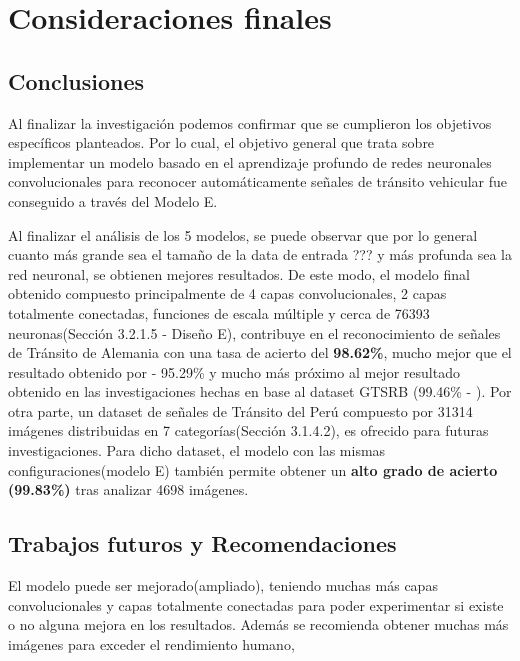 \chapter{Consideraciones finales}
\setcounter{page}{138}
\renewcommand{\baselinestretch}{2} %
\textheight 21cm

\section{Conclusiones}

	Al finalizar la investigación podemos confirmar que se cumplieron los objetivos específicos planteados. Por lo cual, el objetivo general que trata sobre implementar un modelo basado en el aprendizaje profundo de redes neuronales convolucionales para reconocer automáticamente señales de tránsito vehicular fue conseguido a través del Modelo E.

	\vskip 0.2cm
	Al finalizar el análisis de los 5 modelos, se puede observar que por lo general cuanto más grande sea el tamaño de la data de entrada ??? y más profunda sea la red neuronal, se obtienen mejores resultados. De este modo, el modelo final obtenido compuesto principalmente de 4 capas convolucionales, 2 capas totalmente conectadas, funciones de escala múltiple y cerca de 76393 neuronas(Sección 3.2.1.5 - Diseño E), contribuye en el reconocimiento de señales de Tránsito de Alemania con una tasa de acierto del {\bf 98.62\%}, mucho mejor que el resultado obtenido por \citep{Ayuque2016} - 95.29\% y mucho más próximo al mejor resultado obtenido en las investigaciones hechas en base al dataset GTSRB (99.46\% - \citep{Ciresan}).
	\vskip 0.2cm
	Por otra parte, un dataset de señales de Tránsito del Perú compuesto por 31314 imágenes distribuidas en 7 categorías(Sección 3.1.4.2), es ofrecido para futuras investigaciones. Para dicho dataset, el modelo con las mismas configuraciones(modelo E) también permite obtener un {\bf alto grado de acierto (99.83\%)} tras analizar 4698 imágenes. 
	 


\section{Trabajos futuros y Recomendaciones}


	El modelo puede ser mejorado(ampliado), teniendo muchas más capas convolucionales y capas totalmente conectadas para poder experimentar si existe o no alguna mejora en los resultados. Además se recomienda obtener muchas más imágenes para exceder el rendimiento humano, \citep{Goodfellow-et-al-2016}

